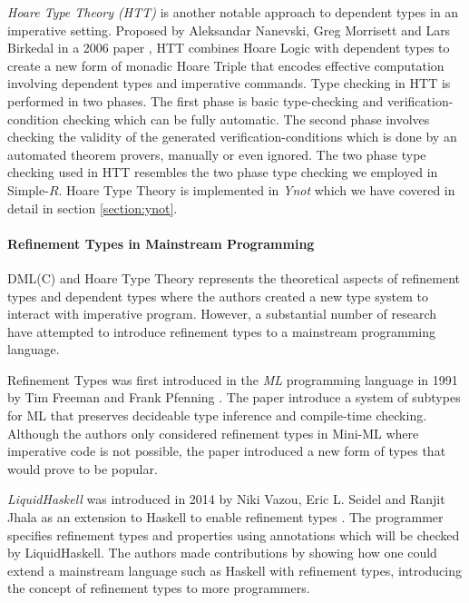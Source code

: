 \documentclass[a4paper,12pt]{report}
\begin{document}
\par
\textit{Hoare Type Theory (HTT)} is another notable approach to 
dependent types in an imperative setting. Proposed by Aleksandar Nanevski, 
Greg Morrisett and Lars Birkedal in a 2006 paper \cite{htt}, HTT 
combines Hoare Logic with dependent types to create a new form of monadic Hoare Triple that encodes 
effective computation involving dependent types and imperative commands. Type 
checking in HTT is performed in two phases. The first phase is basic type-checking 
and verification-condition checking which can be fully automatic. The second 
phase involves checking the validity of the generated verification-conditions 
which is done by an automated theorem provers, manually or even ignored. The two 
phase type checking used in HTT resembles the two phase type checking we 
employed in Simple-$R$. Hoare Type Theory is implemented in \textit{Ynot} which 
we have covered in detail in section \ref{section:ynot}.

\paragraph{Refinement Types in Mainstream Programming} DML(C) and Hoare Type 
Theory represents the theoretical aspects of refinement types and dependent 
types where the authors created a new type system to interact with imperative 
program. However, a substantial number of research have attempted to introduce 
refinement types to a mainstream programming language. 

\par
Refinement Types was first introduced in the \textit{ML} programming 
language in 1991 by Tim Freeman and Frank Pfenning \cite{refInML}. The paper 
introduce a system of subtypes for ML that preserves decideable type inference 
and compile-time checking. Although the authors only considered refinement types 
in Mini-ML where imperative code is not possible, the paper introduced a 
new form of types that would prove to be popular.

\par
\textit{LiquidHaskell} was introduced in 2014 by Niki Vazou, Eric L. Seidel and 
Ranjit Jhala as an extension to Haskell to enable refinement types \cite{liqHaskell}. 
The programmer specifies refinement types and properties using annotations which 
will be checked by LiquidHaskell. The authors made contributions by showing how 
one could extend a mainstream language such as Haskell with refinement types, 
introducing the concept of refinement types to more programmers. 
\end{document}
